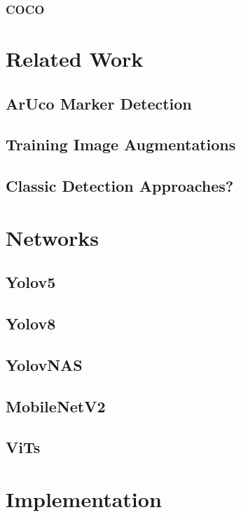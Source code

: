\documentclass[10pt]{book}
\begin{document}
\subsection{COCO}

\chapter{Related Work}
\label{chap:relatedw}

\section{ArUco Marker Detection}

\section{Training Image Augmentations}

\section{Classic Detection Approaches?}

\chapter{Networks}
\label{chap:netw}

\section{Yolov5}

\section{Yolov8}

\section{YolovNAS}

\section{MobileNetV2}

\section{ViTs}

\chapter{Implementation}
\label{chap:implement}
\end{document}
